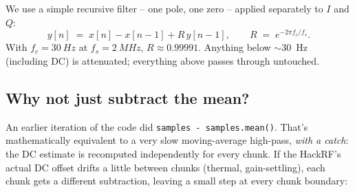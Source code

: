 \documentclass[11pt,a4paper]{article}
\begin{document}
We use a simple recursive filter -- one pole, one zero -- applied
separately to \(I\) and \(Q\):
\begin{equation}
y[n] \;=\; x[n] - x[n{-}1] + R\,y[n{-}1],
\qquad R \;=\; e^{-2\pi f_c / f_s}.
\end{equation}
With \(f_c=\SI{30}{Hz}\) at \(f_s=\SI{2}{MHz}\), \(R \approx 0.99991\).
Anything below \(\sim\)\SI{30}{Hz} (including DC) is attenuated;
everything above passes through untouched.

\begin{center}
\end{center}

\subsection{Why not just subtract the mean?}

An earlier iteration of the code did \texttt{samples -
samples.mean()}.  That's mathematically equivalent to a very slow
moving-average high-pass, \emph{with a catch}: the DC estimate is
recomputed independently for every chunk.  If the HackRF's actual DC
offset drifts a little between chunks (thermal, gain-settling), each
chunk gets a different subtraction, leaving a small step at every
chunk boundary:
\end{document}

